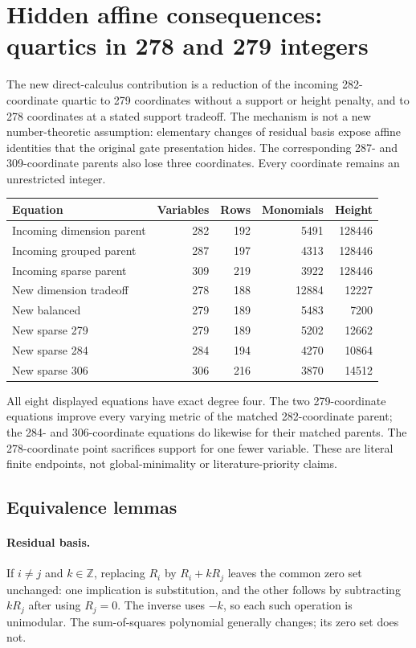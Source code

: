 \section{Hidden affine consequences: quartics in 278 and 279 integers}
\label{sec:row-exposure}

The new direct-calculus contribution is a reduction of the incoming
282-coordinate quartic to 279 coordinates without a support or height
penalty, and to 278 coordinates at a stated support tradeoff.  The mechanism
is not a new number-theoretic assumption: elementary changes of residual
basis expose affine identities that the original gate presentation hides.
The corresponding 287- and 309-coordinate parents also lose three
coordinates.  Every coordinate remains an unrestricted integer.

\begin{center}\small
\begin{tabular}{lrrrr}
\hline
Equation & Variables & Rows & Monomials & Height\\
\hline
Incoming dimension parent &282&192&5491&128446\\
Incoming grouped parent &287&197&4313&128446\\
Incoming sparse parent &309&219&3922&128446\\
\hline
New dimension tradeoff &278&188&12884&12227\\
New balanced &279&189&5483&7200\\
New sparse 279 &279&189&5202&12662\\
New sparse 284 &284&194&4270&10864\\
New sparse 306 &306&216&3870&14512\\
\hline
\end{tabular}
\end{center}

All eight displayed equations have exact degree four.  The two
279-coordinate equations improve every varying metric of the matched
282-coordinate parent; the 284- and 306-coordinate equations do likewise
for their matched parents.  The 278-coordinate point sacrifices support
for one fewer variable.  These are literal finite endpoints, not
global-minimality or literature-priority claims.

\subsection{Equivalence lemmas}

\paragraph{Residual basis.}
If $i\ne j$ and $k\in\mathbb Z$, replacing $R_i$ by $R_i+kR_j$
leaves the common zero set unchanged: one implication is substitution,
and the other follows by subtracting $kR_j$ after using $R_j=0$.
The inverse uses $-k$, so each such operation is unimodular.  The
sum-of-squares polynomial generally changes; its zero set does not.

